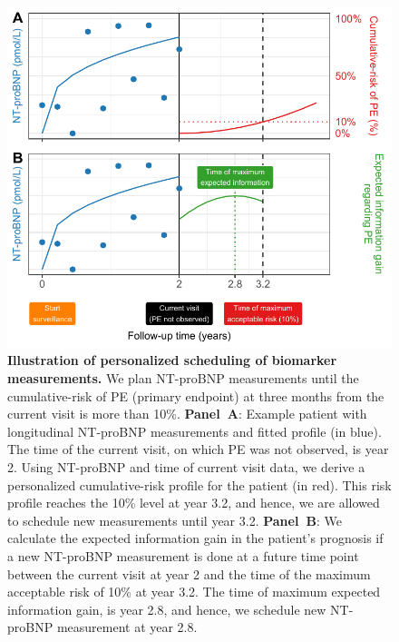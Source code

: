 \begin{figure}
\includegraphics{contents/c6/images/c6_fig1.pdf}
\caption{\textbf{Illustration of personalized scheduling of biomarker measurements.} We plan NT-proBNP measurements until the cumulative-risk of PE (primary endpoint) at three months from the current visit is more than 10\%. \textbf{Panel~A}: Example patient with longitudinal NT-proBNP measurements and fitted profile (in blue). The time of the current visit, on which PE was not observed, is year 2. Using NT-proBNP and time of current visit data, we derive a personalized cumulative-risk profile for the patient (in red). This risk profile reaches the 10\% level at year 3.2, and hence, we are allowed to schedule new measurements until year 3.2. \textbf{Panel~B}: We calculate the expected information gain in the patient's prognosis if a new NT-proBNP measurement is done at a future time point between the current visit at year 2 and the time of the maximum acceptable risk of 10\% at year 3.2. The time of maximum expected information gain, is year 2.8, and hence, we schedule new NT-proBNP measurement at year 2.8.}
\label{c6:fig:1}
\end{figure}

